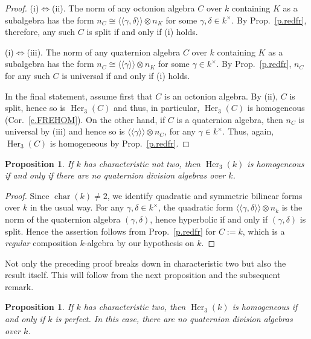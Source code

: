\documentclass{amsart}
\newtheorem{prop}[equation]{Proposition}
\theoremstyle{definition} %
\theoremstyle{remark} %
\DeclareMathOperator{\ch}{char}
\newcommand{\dla}{\langle\langle}
\newcommand{\dra}{\rangle\rangle}
\renewcommand{\:}{\colon\,}
\DeclareMathOperator{\Her}{Her}
\numberwithin{equation}{section}
\begin{document}
\begin{proof}
(i)$\Leftrightarrow$(ii). The norm of any octonion algebra $C$ over $k$ containing $K$ as a subalgebra has the form $n_C \cong \dla\gamma,\delta\dra \otimes n_K$ for some $\gamma,\delta \in k^\times$. By Prop.~\ref{p.redfr}, therefore, any such $C$ is split if and only if (i) holds.

(i)$\Leftrightarrow$(iii). The norm of any quaternion algebra $C$ over $k$ containing $K$ as a subalgebra has the form $n_C \cong \dla\gamma\dra \otimes n_K$ for some $\gamma \in k^\times$. By Prop.~\ref{p.redfr}, $n_C$ for any such $C$ is universal if and only if (i) holds.

In the final statement, assume first that $C$ is an octonion algebra. By (ii), $C$ is split, hence so is $\Her_3(C)$ and thus, in particular, $\Her_3(C)$ is homogeneous (Cor.~\ref{c.FREHOM}). On the other hand, if $C$ is a quaternion algebra, then $n_C$ is universal by (iii) and hence so is $\dla\gamma\dra \otimes n_C$, for any $\gamma \in k^\times$. Thus, again, $\Her_3(C)$ is homogeneous by Prop.~\ref{p.redfr}.
\end{proof}

\begin{prop} \label{p.BASHOM}
If $k$ has characteristic not two, then $\Her_3(k)$ is homogeneous if and only if there are no quaternion division algebras over $k$. 
\end{prop}

\begin{proof}
Since $\ch(k) \ne 2$, we identify  quadratic and symmetric bilinear forms over $k$ in the usual way. For any $\gamma,\delta \in k^\times$, the quadratic form $\dla\gamma,\delta\dra \otimes n_k$ is the norm of the quaternion algebra $(\gamma,\delta)$, hence hyperbolic if and only if $(\gamma,\delta)$ is split. Hence the assertion follows from Prop.~\ref{p.redfr} for $C := k$, which is a \emph{regular} composition $k$-algebra by our hypothesis on $k$. 
\end{proof}

Not only the preceding proof breaks down in characteristic two but also the result itself. This will follow from the next proposition and the subsequent remark.

\begin{prop} \label{p.BATWOM}
If $k$ has characteristic two, then $\Her_3(k)$ is homogeneous if and only if $k$ is perfect. In this case, there are no quaternion division algebras over $k$.    
\end{prop}
\end{document}
